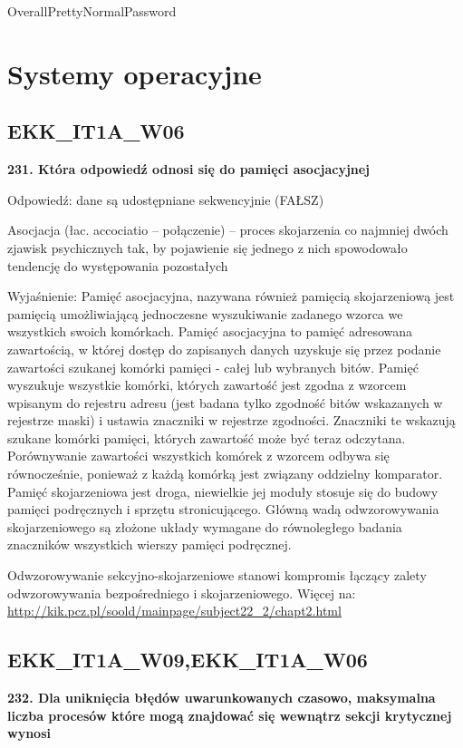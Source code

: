 OverallPrettyNormalPassword
\chapter{Systemy operacyjne}
\PartialToc
\section{EKK\_IT1A\_W06}
\textbf{231. Która odpowiedź odnosi się do pamięci asocjacyjnej}

\vspace{0.4cm}

Odpowiedź: dane są udostępniane sekwencyjnie (FAŁSZ)


Asocjacja (łac. accociatio – połączenie) – proces skojarzenia co najmniej dwóch zjawisk psychicznych tak, by pojawienie się jednego z nich spowodowało tendencję do występowania pozostałych

Wyjaśnienie:
Pamięć asocjacyjna, nazywana również pamięcią skojarzeniową jest pamięcią umożliwiającą jednoczesne wyszukiwanie zadanego wzorca we wszystkich swoich komórkach.
Pamięć asocjacyjna to pamięć adresowana zawartością, w której dostęp do zapisanych danych uzyskuje się przez podanie zawartości szukanej komórki pamięci - całej lub wybranych bitów.
Pamięć wyszukuje wszystkie komórki, których zawartość jest zgodna z wzorcem wpisanym do rejestru adresu (jest badana tylko zgodność bitów wskazanych w rejestrze maski)
i ustawia znaczniki w rejestrze zgodności. Znaczniki te wskazują szukane komórki pamięci, których zawartość może być teraz odczytana.
Porównywanie zawartości wszystkich komórek z wzorcem odbywa się równocześnie, ponieważ z każdą komórką jest związany oddzielny komparator.
Pamięć skojarzeniowa jest droga, niewielkie jej moduły stosuje się do budowy pamięci podręcznych i sprzętu stronicującego.
Główną wadą odwzorowywania skojarzeniowego są złożone układy wymagane do równoległego badania znaczników wszystkich wierszy pamięci podręcznej.


Odwzorowywanie sekcyjno-skojarzeniowe stanowi kompromis łączący zalety odwzorowywania bezpośredniego i skojarzeniowego.
Więcej na: 	\url{http://kik.pcz.pl/soold/mainpage/subject22_2/chapt2.html}



\section{EKK\_IT1A\_W09,EKK\_IT1A\_W06}
\textbf{232. Dla uniknięcia błędów uwarunkowanych czasowo, maksymalna liczba procesów które mogą znajdować się wewnątrz sekcji krytycznej wynosi}

